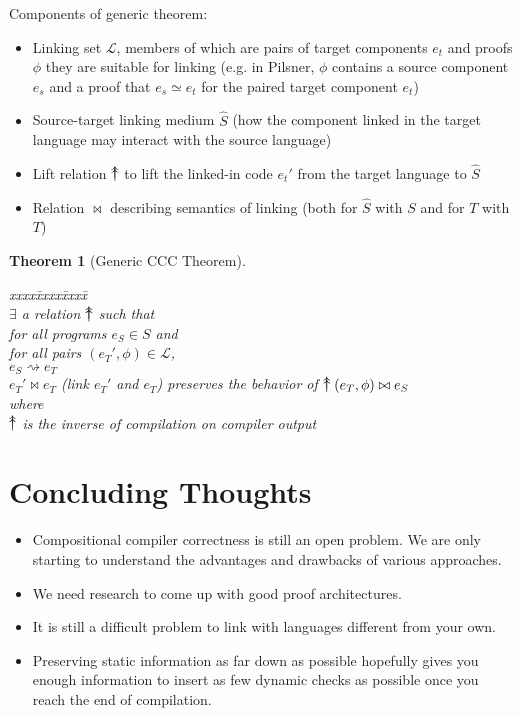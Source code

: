 \documentclass[11pt]{article}
\newcommand{\compile}{\rightsquigarrow}
\newtheorem{thm}{Theorem}[section]
\newcommand\twouparrow{%
\mathrel{\mathchoice
  {\raise2pt\hbox{%
  \ooalign{\hss$\uparrow$\hss\cr\lower2pt\hbox{%
  $\uparrow$}}}}
  {\raise2pt\hbox{%
  \ooalign{\hss$\uparrow$\hss\cr\lower2pt\hbox{%
  $\uparrow$}}}}
  {\raise1.5pt\hbox{%
  \ooalign{\hss$\scriptstyle\uparrow$\hss\cr\lower1.5pt\hbox{%
  $\scriptstyle\uparrow$}}}}
  {\raise1.1pt\hbox{%
  \ooalign{\hss$\scriptscriptstyle\uparrow$\hss\cr\lower1.1pt\hbox{%
  $\scriptscriptstyle\uparrow$}}}}
}}
\begin{document}
Components of generic theorem:
\begin{itemize}
\item Linking set $\mathcal{L}$, members of which are pairs of target
  components $e_t$ and proofs $\phi$ they are suitable for linking
  (e.g. in Pilsner, $\phi$ contains a source component $e_s$ and a
  proof that $e_s \simeq e_t$ for the paired target component $e_t$)
\item Source-target linking medium $\hat{S}$ (how the component linked
  in the target language may interact with the source language)
\item Lift relation $\twouparrow$ to lift the linked-in code $e_t'$
  from the target language to $\hat{S}$
\item Relation $\bowtie$ describing semantics of linking (both for
  $\hat{S}$ with $S$ and for $T$ with $T$)
\end{itemize}

\begin{thm}[Generic CCC Theorem]
  \begin{tabbing}
    xxxx\=xxxx\=xxxx\=\kill \\
    $\exists$ a relation $\twouparrow$ such that \\
    \> for all programs $e_S \in S$ and \\
    \> for all pairs $(e_T', \phi) \in \mathcal{L}$, \\
    \> $e_S \compile e_T$ \\
    \> $e_T' \bowtie e_T$ (link $e_T'$ and $e_T$) preserves the
    behavior of $\twouparrow(e_T, \phi) \bowtie e_S$ \\
    where \\
    \> $\twouparrow$ is the inverse of compilation on compiler output
  \end{tabbing}
\end{thm}


\section{Concluding Thoughts}
\begin{itemize}
\item Compositional compiler correctness is still an open problem.  We
  are only starting to understand the advantages and drawbacks of
  various approaches.
\item We need research to come up with good proof architectures.
\item It is still a difficult problem to link with languages different
  from your own.
\item Preserving static information as far down as possible hopefully
  gives you enough information to insert as few dynamic checks as
  possible once you reach the end of compilation.
\end{itemize}
\end{document}
